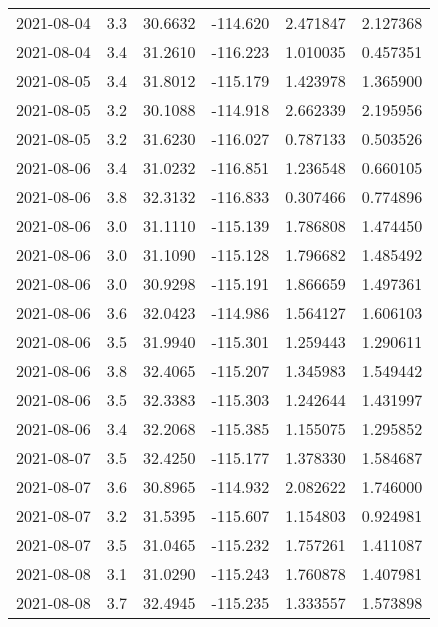 \begin{tabular}{lrrrrr}
2021-08-04 &       3.3 &  30.6632 &  -114.620 &         2.471847 &         2.127368 \\
2021-08-04 &       3.4 &  31.2610 &  -116.223 &         1.010035 &         0.457351 \\
2021-08-05 &       3.4 &  31.8012 &  -115.179 &         1.423978 &         1.365900 \\
2021-08-05 &       3.2 &  30.1088 &  -114.918 &         2.662339 &         2.195956 \\
2021-08-05 &       3.2 &  31.6230 &  -116.027 &         0.787133 &         0.503526 \\
2021-08-06 &       3.4 &  31.0232 &  -116.851 &         1.236548 &         0.660105 \\
2021-08-06 &       3.8 &  32.3132 &  -116.833 &         0.307466 &         0.774896 \\
2021-08-06 &       3.0 &  31.1110 &  -115.139 &         1.786808 &         1.474450 \\
2021-08-06 &       3.0 &  31.1090 &  -115.128 &         1.796682 &         1.485492 \\
2021-08-06 &       3.0 &  30.9298 &  -115.191 &         1.866659 &         1.497361 \\
2021-08-06 &       3.6 &  32.0423 &  -114.986 &         1.564127 &         1.606103 \\
2021-08-06 &       3.5 &  31.9940 &  -115.301 &         1.259443 &         1.290611 \\
2021-08-06 &       3.8 &  32.4065 &  -115.207 &         1.345983 &         1.549442 \\
2021-08-06 &       3.5 &  32.3383 &  -115.303 &         1.242644 &         1.431997 \\
2021-08-06 &       3.4 &  32.2068 &  -115.385 &         1.155075 &         1.295852 \\
2021-08-07 &       3.5 &  32.4250 &  -115.177 &         1.378330 &         1.584687 \\
2021-08-07 &       3.6 &  30.8965 &  -114.932 &         2.082622 &         1.746000 \\
2021-08-07 &       3.2 &  31.5395 &  -115.607 &         1.154803 &         0.924981 \\
2021-08-07 &       3.5 &  31.0465 &  -115.232 &         1.757261 &         1.411087 \\
2021-08-08 &       3.1 &  31.0290 &  -115.243 &         1.760878 &         1.407981 \\
2021-08-08 &       3.7 &  32.4945 &  -115.235 &         1.333557 &         1.573898 \\

\end{tabular}
